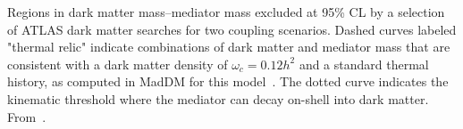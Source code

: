 Regions in dark matter mass--\Zprime mediator mass excluded at 95\% CL by a selection of ATLAS dark matter searches for two coupling scenarios. Dashed curves labeled "thermal relic" indicate combinations of dark matter and mediator mass that are consistent with a dark matter density of $\omega_c = 0.12 h^2$ and a standard thermal history, as computed in MadDM for this model~\cite{Backovic:2015cra}. The dotted curve indicates the kinematic threshold where the mediator can decay on-shell into dark matter. From~\cite{ATLASSummary}.